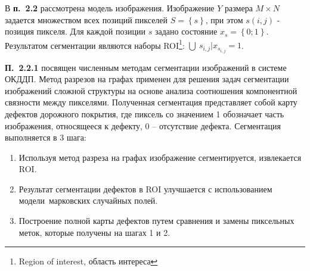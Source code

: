 
В \textbf{п.~2.2} рассмотрена модель изображения. Изображение $Y$ размера $M \times N$ задается множеством всех позиций пикселей $S = \left\{s\right\}$, при этом $s \left(i, j\right)$ - позиция пикселя. Для каждой позиции $s$ задано состояние $x_s=\left\{0;1\right\}$. Результатом сегментации являются наборы ROI\footnote{Region of interest, область интереса}: $\bigcup\ s_{i,j} | x_{s_{i,j}}=1$.


\textbf{П.~2.2.1} посвящен численным методам сегментации изображений в системе ОКДДП. Метод разрезов на графах применен для решения задач сегментации изображений сложной структуры на основе анализа соотношения компонентной связности между пикселями. Полученная сегментация представляет собой карту дефектов дорожного покрытия, где пиксель со значением 1 обозначает часть изображения, относящееся к дефекту, 0 -- отсутствие дефекта. Сегментация выполняется в 3 шага:

\begin{enumerate}[label=\textbf{Шаг~\arabic*.},leftmargin=4em]
\item Используя метод разреза на графах изображение сегментируется, извлекается ROI.
\item Результат сегментации дефектов в ROI улучшается с использованием модели марковских случайных полей.
\item Построение полной карты дефектов путем сравнения и замены пиксельных меток, которые получены на шагах 1 и 2.
\end{enumerate}

